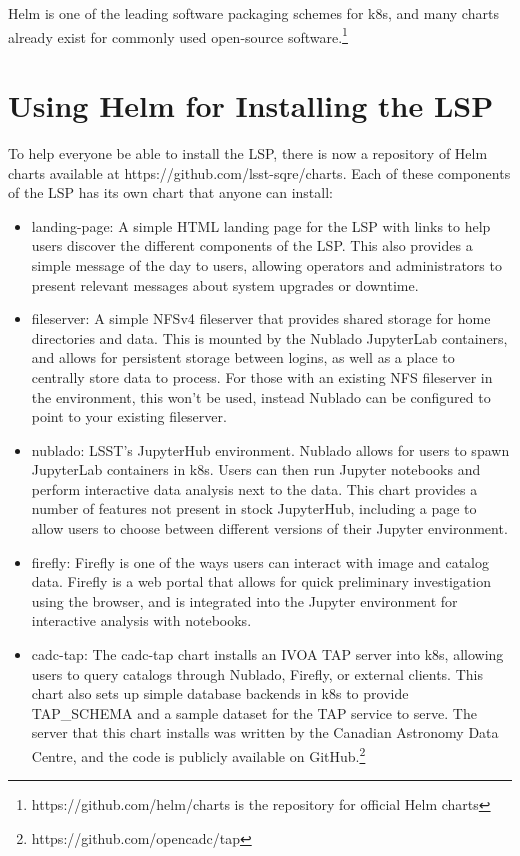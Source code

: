\documentclass[11pt,twoside]{article}
\begin{document}
Helm is one of the leading software packaging schemes for k8s, and many charts
already exist for commonly used open-source software.\footnote{https://github.com/helm/charts
is the repository for official Helm charts}

\section{Using Helm for Installing the LSP}

To help everyone be able to install the LSP, there is now a repository of Helm
charts available at https://github.com/lsst-sqre/charts.  Each of these components
of the LSP has its own chart that anyone can install:

\begin{itemize}

\item landing-page: A simple HTML landing page for the LSP with links to help users
discover the different components of the LSP.  This also provides a simple message of
the day to users, allowing operators and administrators to present relevant
messages about system upgrades or downtime.

\item fileserver: A simple NFSv4 fileserver that provides shared storage for
home directories and data.  This is mounted by the Nublado JupyterLab containers,
and allows for persistent storage between logins, as well as a place to centrally
store data to process.  For those with an existing NFS fileserver in the environment,
this won't be used, instead Nublado can be configured to point to your existing
fileserver.

\item nublado: LSST's JupyterHub environment.  Nublado allows for users to spawn
JupyterLab containers in k8s.  Users can then run Jupyter notebooks and perform interactive
data analysis next to the data.  This chart provides a number of features not present
in stock JupyterHub, including a page to allow users to choose between different versions
of their Jupyter environment.

\item firefly: Firefly \citep{2013ASPC..475..315R} is one of the ways users can interact with image and catalog
data.  Firefly is a web portal that allows for quick preliminary
investigation using the browser, and is integrated into the Jupyter
environment for interactive analysis with notebooks.

\item cadc-tap: The cadc-tap chart installs an IVOA TAP \citep[Table Access Protocol;][]{2010ivoa.spec.0327D}
server into k8s, allowing users to query catalogs through Nublado, Firefly,
or external clients.  This chart also sets up simple database backends
in k8s to provide TAP\_SCHEMA and a sample dataset for the TAP service to serve.
The server that this chart installs was written by the Canadian Astronomy Data Centre,
and the code is publicly available on GitHub.\footnote{https://github.com/opencadc/tap}

\end{itemize}
\end{document}
